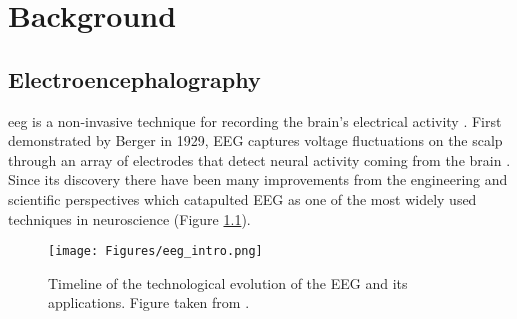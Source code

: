 
\chapter{Background}
\label{chapter:background}

\section{Electroencephalography}
\label{section:EEG}

\acrfull{eeg} is a non-invasive technique for recording the brain's electrical activity \cite{schomerNiedermeyersElectroencephalographyBasic2018}. First demonstrated by Berger in 1929, EEG captures voltage fluctuations on the scalp through an array of electrodes that detect neural activity coming from the brain \cite{bergerUeberElektrenkephalogrammMenschen1929}. Since its discovery there have been many improvements from the engineering and scientific perspectives which catapulted EEG as one of the most widely used techniques in neuroscience \cite{biasiucciElectroencephalography2019} (Figure \ref{fig:eeg_intro}).

\begin{figure}[H]
	\centering
	\texttt{[image: Figures/eeg\_intro.png]}
	\caption{Timeline of the technological evolution of the EEG and its applications. Figure taken from \cite{biasiucciElectroencephalography2019}. \label{fig:eeg_intro}}
\end{figure}

